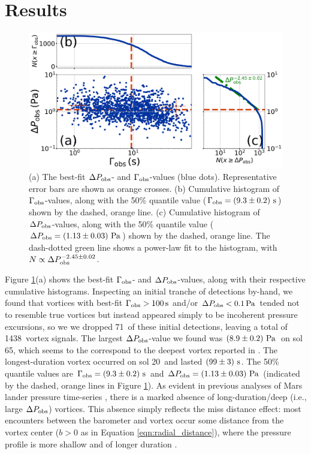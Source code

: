 \documentclass{aastex63}
\newcommand{\totalvortices}{1438}
\newcommand{\maskedvortices}{71}
\newcommand{\largestDeltaPobs}{$\left( 8.9 \pm 0.2 \right)\,{\rm Pa}$}
\newcommand{\largestDeltaPobssol}{65}
\newcommand{\largestGammaobssol}{20}
\newcommand{\largestGammaobs}{$\left( 99 \pm 3 \right)\,{\rm s}$}
\begin{document}
\section{Results}
\begin{figure}
    \centering
    \includegraphics[width=\textwidth]{figures/DeltaPobs_vs_Gammaobs.png}
    \caption{(a) The best-fit $\Delta P_{\rm obs}$- and $\Gamma_{\rm obs}$-values (blue dots). Representative error bars are shown as orange crosses. (b) Cumulative histogram of $\Gamma_{\rm obs}$-values, along with the 50\% quantile value ($\Gamma_{\rm obs} = \left( 9.3 \pm 0.2 \right)\,{\rm s}$) shown by the dashed, orange line. (c) Cumulative histogram of $\Delta P_{\rm obs}$-values, along with the 50\% quantile value ($\Delta P_{\rm obs} = \left( 1.13 \pm 0.03 \right)\,{\rm Pa}$) shown by the dashed, orange line. The dash-dotted green line shows a power-law fit to the histogram, with $N \propto \Delta P_{\rm obs}^{-2.45\pm0.02}$.}
    \label{fig:DeltaPobs_vs_Gammaobs}
\end{figure}

Figure \ref{fig:DeltaPobs_vs_Gammaobs}(a) shows the best-fit $\Gamma_{\rm obs}$- and $\Delta P_{\rm obs}$-values, along with their respective cumulative histograms. Inspecting an initial tranche of detections by-hand, we found that vortices with best-fit $\Gamma_{\rm obs} > 100\,{\rm s}$ and/or $\Delta P_{\rm obs} < 0.1\,{\rm Pa}$ tended not to resemble true vortices but instead appeared simply to be incoherent pressure excursions, so we we dropped \maskedvortices\ of these initial detections, leaving a total of \totalvortices\ vortex signals. The largest $\Delta P_{\rm obs}$-value we found was \largestDeltaPobs\ on sol \largestDeltaPobssol, which seems to the correspond to the deepest vortex reported in \citet{2020arXiv200501134S}. The longest-duration vortex occurred on sol \largestGammaobssol\ and lasted \largestGammaobs. The 50\% quantile values are $\Gamma_{\rm obs} = \left( 9.3 \pm 0.2 \right)\,{\rm s}$ and $\Delta P_{\rm obs} = \left( 1.13 \pm 0.03 \right)\,{\rm Pa}$ (indicated by the dashed, orange lines in Figure \ref{fig:DeltaPobs_vs_Gammaobs}). As evident in previous analyses of Mars lander pressure time-series \citep[e.g.][]{2010JGRE..115.0E16E}, there is a marked absence of long-duration/deep (i.e., large $\Delta P_{\rm obs}$) vortices. This absence simply reflects the miss distance effect: most encounters between the barometer and vortex occur some distance from the vortex center ($b > 0$ as in Equation \ref{eqn:radial_distance}), where the pressure profile is more shallow and of longer duration \citep{2018Icar..299..166J}.
\end{document}

